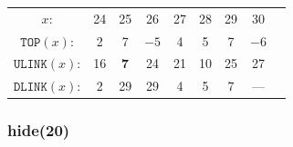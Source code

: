 \documentclass[a4paper,landscape,11pt]{article}
\begin{document}
\begin{table}
\begin{center}
\begin{tabular}{c c c c c c c c c }
			\hline
			$x$:                 & 24  & 25         & 26   & 27   & 28          & 29         & 30   &             \\
			$\texttt{TOP}(x)$:   & 2   & 7          & $-5$ & 4    & 5           & 7          & $-6$ &             \\
			$\texttt{ULINK}(x)$: & 16  & \textbf{7} & 24   & 21   & 10          & 25         & 27   &             \\
			$\texttt{DLINK}(x)$: & 2   & 29         & 29   & 4    & 5           & 7          & ---  &             \\
		\end{tabular}
	\end{center}
\end{table}

\subsubsection{hide(20)}
\end{document}
